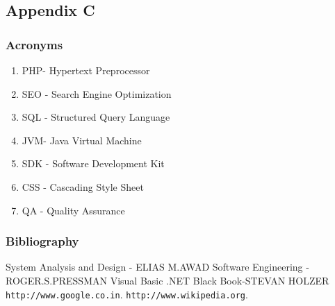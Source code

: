 \documentclass[a4paper,12pt]{article}
\begin{document}
\subsection{Appendix C}\vspace{5mm}
\subsubsection{Acronyms}\vspace{5mm}
\begin{enumerate}
\item PHP- Hypertext Preprocessor
\item SEO - Search Engine Optimization
\item SQL - Structured Query Language
\item JVM- Java Virtual Machine
\item SDK - Software Development Kit
\item CSS - Cascading Style Sheet
\item QA - Quality Assurance
\end{enumerate}
\subsubsection{Bibliography}\vspace{5mm}
\begin{thebibliography}{10}
 System Analysis and Design   - ELIAS M.AWAD                                                        
Software Engineering   -ROGER.S.PRESSMAN
 Visual Basic .NET Black Book-STEVAN HOLZER                                
 \texttt{http://www.google.co.in}.
 \texttt{http://www.wikipedia.org}.
 \end{thebibliography}
\end{document}
